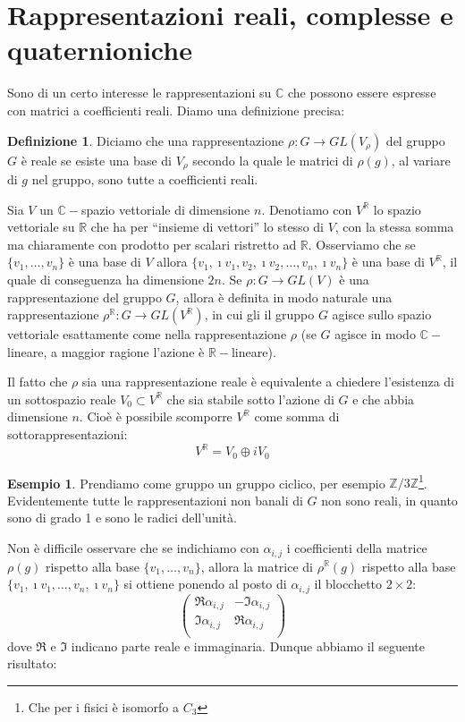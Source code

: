 \documentclass[11pt]{article}
\theoremstyle{plain}
\theoremstyle{definition}
\newtheorem{defn}{Definizione}[section]
\newtheorem{exmp}{Esempio}[section]
\theoremstyle{remark}
\newcommand{\C}{\mathbb{C}}
\newcommand{\R}{\mathbb{R}}
\newcommand{\Z}{\mathbb{Z}}
\begin{document}
\newpage
\section{Rappresentazioni reali, complesse e quaternioniche}

Sono di un certo interesse le rappresentazioni su $\C$ che possono essere espresse con matrici a coefficienti reali. Diamo una definizione precisa:

\begin{defn}
Diciamo che una rappresentazione $\rho:G\to GL(V_\rho)$ del gruppo $G$ è reale se esiste una base di $V_\rho$ secondo la quale
le matrici di $\rho(g)$, al variare di $g$ nel gruppo, sono tutte a coefficienti reali.
\label{def: rappr reale}
\end{defn}

Sia $V$ un $\C-$spazio vettoriale di dimensione $n$.
Denotiamo con $V^\R$ lo spazio vettoriale su $\R$ che ha per ``insieme di vettori''
lo stesso di $V$, con la stessa somma ma chiaramente con prodotto per scalari ristretto ad $\R$.
Osserviamo che se $\{v_1, \dots, v_n\}$ è una base di $V$ allora
$\{v_1, \imath v_1, v_2, \imath v_2,\dots, v_n, \imath v_n\}$ è una base di $V^\R$, il quale di conseguenza ha dimensione $2n$.
Se $\rho:G\to GL(V)$ è una rappresentazione del gruppo $G$, allora è definita
in modo naturale una rappresentazione $\rho^\R:G\to GL(V^\R)$, in cui gli il gruppo $G$
agisce sullo spazio vettoriale esattamente come nella rappresentazione $\rho$ (se $G$ agisce
in modo $\C-$lineare, a maggior ragione l'azione è $\R-$lineare).

Il fatto che $\rho$ sia una rappresentazione reale è equivalente a chiedere l'esistenza di un sottospazio reale $V_0 \subset V^\R$ che sia stabile sotto l'azione di $G$ e che abbia dimensione $n$. Cioè è possibile scomporre $V^\R$ come somma di sottorappresentazioni:
\[ V^\R = V_0 \oplus i V_0 \]

\begin{exmp}
Prendiamo come gruppo un gruppo ciclico, per esempio $\Z / 3\Z$\footnote{Che per i fisici è isomorfo a $C_3$}. Evidentemente tutte le rappresentazioni non banali di $G$ non sono reali, in quanto sono di grado 1 e sono le radici dell'unità.
\end{exmp}

Non è difficile osservare che se indichiamo con $\alpha_{i,j}$ i coefficienti della matrice $\rho(g)$
rispetto alla base $\{v_1, \dots, v_n\}$, allora la matrice di $\rho^\R(g)$ rispetto alla base
$\{v_1, \imath v_1,\dots, v_n, \imath v_n\}$ si ottiene
ponendo al posto di $\alpha_{i,j}$ il blocchetto $2\times 2$:
\[\begin{pmatrix}
	\Re \alpha_{i,j} & -\Im \alpha_{i,j}\\
	\Im \alpha_{i,j} & \Re \alpha_{i,j}\\
\end{pmatrix}\]
dove $\Re$ e $\Im$ indicano parte reale e immaginaria.
Dunque abbiamo il seguente risultato:
\end{document}

